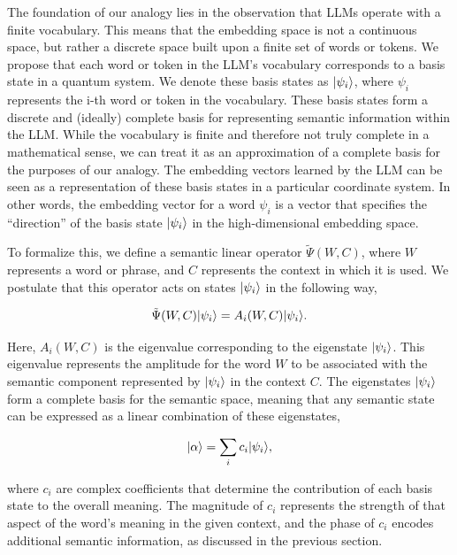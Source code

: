\documentclass[prd,amsmath,amssymb,12pt]{revtex4}
\DeclarePairedDelimiter\ket{\lvert}{\rangle}
\begin{document}
The foundation of our analogy lies in the observation that LLMs operate with a finite vocabulary. This means
that the embedding space is not a continuous space, but rather a discrete space built upon a finite set of
words or tokens. We propose that each word or token in the LLM's vocabulary corresponds to a basis state in
a quantum system. We denote these basis states as $\ket{\psi_i}$, where $\psi_i$ represents the i-th word or
token in the vocabulary. These basis states form a discrete and (ideally) complete basis for representing semantic
information within the LLM. While the vocabulary is finite and therefore not truly complete in a mathematical
sense, we can treat it as an approximation of a complete basis for the purposes of our analogy. The embedding
vectors learned by the LLM can be seen as a representation of these basis states in a particular coordinate
system. In other words, the embedding vector for a word $\psi_i$ is a vector that specifies the ``direction''
of the basis state $\ket{\psi_i}$ in the high-dimensional embedding space.

To formalize this, we define a semantic linear operator $\tilde{\Psi}(W, C)$, where $W$ represents a word or phrase,
and $C$ represents the context in which it is used. We postulate that this operator acts on states
$\ket{\psi_i}$ in the following way,

\begin{equation}
    \tilde{\Psi}(W, C)\ket{\psi_i}  = A_i(W, C)\ket{\psi_i}.
\end{equation}

\noindent
Here, $A_i(W, C)$ is the eigenvalue corresponding to the eigenstate $\ket{\psi_i}$. This eigenvalue represents
the amplitude for the word $W$ to be associated with the semantic component represented by $\ket{\psi_i}$ in
the context $C$. The eigenstates $\ket{\psi_i}$ form a complete basis for the semantic space, meaning that
any semantic state can be expressed as a linear combination of these eigenstates,

\begin{equation}
    \ket{\alpha} = \sum_{i}  c_i\ket{\psi_i},
\end{equation}

\noindent
where $c_i$ are complex coefficients that determine the contribution of each basis state to the overall
meaning. The magnitude of $c_i$ represents the strength of that aspect of the word's
meaning in the given context, and the phase of $c_i$ encodes additional semantic information, as discussed
in the previous section.
\end{document}
